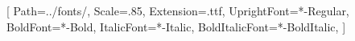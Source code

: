 \usepackage{fontspec}

\setmonofont{JetBrainsMono}[
    Path=../fonts/,
    Scale=.85,
    Extension=.ttf,
    UprightFont=*-Regular,
    BoldFont=*-Bold,
    ItalicFont=*-Italic,
    BoldItalicFont=*-BoldItalic,
]